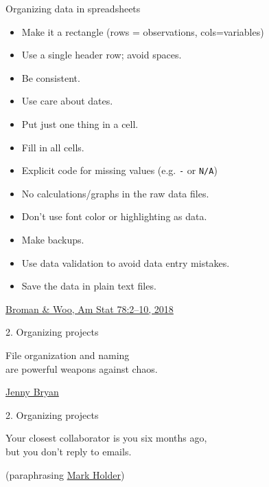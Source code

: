 \documentclass[12pt,t]{beamer}
\begin{document}
\begin{frame}[c]{Organizing data in spreadsheets}

  \begin{itemize}
    \footnotesize
  \item Make it a rectangle (rows = observations, cols=variables)
  \item Use a single header row; avoid spaces.
  \item Be consistent.
  \item Use care about dates.
  \item Put just one thing in a cell.
  \item Fill in all cells.
  \item Explicit code for missing values (e.g. {\tt -} or {\tt N/A})
  \item No calculations/graphs in the raw data files.
  \item Don't use font color or highlighting as data.
  \item Make backups.
  \item Use data validation to avoid data entry mistakes.
  \item Save the data in plain text files.
  \end{itemize}


\vspace{7mm}

\hfill
{\footnotesize \lolit
\href{https://doi.org/10.1080/00031305.2017.1375989}{Broman \& Woo,
Am Stat 78:2--10, 2018}
}




\end{frame}





\begin{frame}[c]{2. Organizing projects}

\begin{center}
\large
File organization and naming \\
are powerful weapons against chaos.
\end{center}

\hfill
{\lolit
{\textendash} \href{http://www.stat.ubc.ca/~jenny/}{Jenny Bryan}
}

\end{frame}


\begin{frame}[c]{2. Organizing projects}

\begin{center}
\large
Your closest collaborator is you six months ago, \\
but you don't reply to emails.
\end{center}

\hfill
{\lolit
(paraphrasing \href{https://twitter.com/kcranstn/status/370914072511791104}{Mark Holder})
}

\end{frame}
\end{document}
